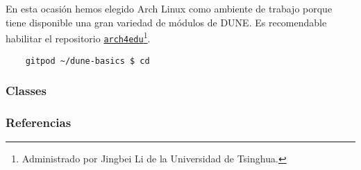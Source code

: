 \begin{frame}

	En esta ocasión hemos elegido Arch Linux como ambiente de trabajo porque tiene disponible una gran variedad de módulos de DUNE.
	Es recomendable habilitar el repositorio \href{https://wiki.archlinux.org/title/Unofficial\_user\_repositories\#arch4edu}{\texttt{arch4edu}}\footnote{Administrado por Jingbei Li de la Universidad de Tsinghua.}.
\end{frame}

\begin{frame}[fragile]
	\begin{lstlisting}
    gitpod ~/dune-basics $ cd
  \end{lstlisting}
\end{frame}

\begin{frame}[fragile]
	\begin{figure}
		\centering
	\end{figure}
\end{frame}


\begin{frame}[fragile]
	\frametitle{Classes}

	


\end{frame}

\begin{frame}\transblindsvertical
	\frametitle{Referencias}
\end{frame}



